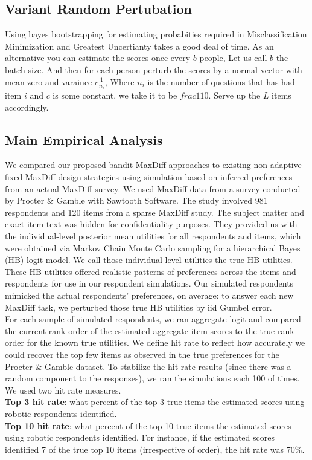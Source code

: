 \documentclass[nonblindrev]{informs3}
\begin{document}
\subsection{Variant Random Pertubation}
Using bayes bootstrapping for estimating probabities required in Misclassification Minimization and Greatest Uncertianty takes a good deal of time. As an alternative you can estimate the scores once every $b$ people, Let us call $b$ the batch size. And then for each person perturb the scores by a normal vector with mean zero and varaince $c\frac{1}{n_i}$, Where $n_i$ is the number of questions that has had item $i$ and $c$ is some constant, we take it to be $frac{1}{10}$. Serve up the $L$ items accordingly.   

\subsection{Main Empirical Analysis}
We compared our proposed bandit MaxDiff approaches to existing non-adaptive fixed MaxDiff design strategies using simulation based on inferred preferences from an actual MaxDiff survey. We used MaxDiff data from a survey conducted by Procter \& Gamble with Sawtooth Software. The study involved 981 respondents and 120 items from a sparse MaxDiff study. The subject matter and exact item text was hidden for confidentiality purposes. They provided us with the individual-level posterior mean utilities for all respondents and items, which were obtained via Markov Chain Monte Carlo sampling for a hierarchical Bayes (HB) logit model. We call those individual-level utilities the true HB utilities.  These HB utilities offered realistic patterns of preferences across the items and respondents for use in our respondent simulations.  Our simulated respondents mimicked the actual respondents' preferences, on average: to answer each new MaxDiff task, we perturbed those true HB utilities by iid Gumbel error.  \\
For each sample of simulated respondents, we ran aggregate logit and compared the current rank order of the estimated aggregate item scores to the true rank order for the known true utilities.  We define hit rate to reflect how accurately we could recover the top few items as observed in the true preferences for the Procter \& Gamble dataset.  To stabilize the hit rate results (since there was a random component to the responses), we ran the simulations each 100 of times. \\
We used two hit rate measures.\\ \textbf{Top 3 hit rate}: what percent of the top 3 true items the estimated scores using robotic respondents identified.\\ \textbf{Top 10 hit rate}: what percent of the top 10 true items the estimated scores using robotic respondents identified.  For instance, if the estimated scores identified 7 of the true top 10 items (irrespective of order), the hit rate was 70\%.\\
\end{document}

